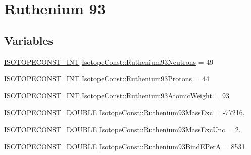 \hypertarget{group___isotope_const-_ruthenium-_ru93}{}\section{Ruthenium 93}
\label{group___isotope_const-_ruthenium-_ru93}
\subsection*{Variables}
\begin{DoxyCompactItemize}
\item 
\mbox{\hyperlink{group___isotope_const-_macros_ga5f18360b3e99483a35c32d789e62621c}{I\+S\+O\+T\+O\+P\+E\+C\+O\+N\+S\+T\+\_\+\+I\+NT}} \mbox{\hyperlink{group___isotope_const-_ruthenium-_ru93_ga0a6b84d8ef6f895abd943a5a1e7e6882}{Isotope\+Const\+::\+Ruthenium93\+Neutrons}} = 49
\item 
\mbox{\hyperlink{group___isotope_const-_macros_ga5f18360b3e99483a35c32d789e62621c}{I\+S\+O\+T\+O\+P\+E\+C\+O\+N\+S\+T\+\_\+\+I\+NT}} \mbox{\hyperlink{group___isotope_const-_ruthenium-_ru93_ga9608c576a1ce87410a02303cdeaca4ac}{Isotope\+Const\+::\+Ruthenium93\+Protons}} = 44
\item 
\mbox{\hyperlink{group___isotope_const-_macros_ga5f18360b3e99483a35c32d789e62621c}{I\+S\+O\+T\+O\+P\+E\+C\+O\+N\+S\+T\+\_\+\+I\+NT}} \mbox{\hyperlink{group___isotope_const-_ruthenium-_ru93_ga491804b39acc55107c7685e5acee7037}{Isotope\+Const\+::\+Ruthenium93\+Atomic\+Weight}} = 93
\item 
\mbox{\hyperlink{group___isotope_const-_macros_ga8f45a7272ce02c0b4c65c44636ed719a}{I\+S\+O\+T\+O\+P\+E\+C\+O\+N\+S\+T\+\_\+\+D\+O\+U\+B\+LE}} \mbox{\hyperlink{group___isotope_const-_ruthenium-_ru93_gadfcc3964d1ea5b6f120dc7391c52e759}{Isotope\+Const\+::\+Ruthenium93\+Mass\+Exc}} = -\/77216.
\item 
\mbox{\hyperlink{group___isotope_const-_macros_ga8f45a7272ce02c0b4c65c44636ed719a}{I\+S\+O\+T\+O\+P\+E\+C\+O\+N\+S\+T\+\_\+\+D\+O\+U\+B\+LE}} \mbox{\hyperlink{group___isotope_const-_ruthenium-_ru93_ga05cc4599c7114361efef74ca2da793ce}{Isotope\+Const\+::\+Ruthenium93\+Mass\+Exc\+Unc}} = 2.
\item 
\mbox{\hyperlink{group___isotope_const-_macros_ga8f45a7272ce02c0b4c65c44636ed719a}{I\+S\+O\+T\+O\+P\+E\+C\+O\+N\+S\+T\+\_\+\+D\+O\+U\+B\+LE}} \mbox{\hyperlink{group___isotope_const-_ruthenium-_ru93_ga664c390e7dd3bff38a66bae3432fcdec}{Isotope\+Const\+::\+Ruthenium93\+Bind\+E\+PerA}} = 8531.
\item 

\end{DoxyCompactItemize}
